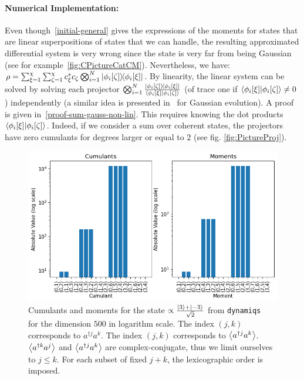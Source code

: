 \paragraph{Numerical Implementation:} Even though~\autoref{initial-general} gives the expressions of the moments for states that are linear superpositions of states that we can handle, the resulting approximated differential system is very wrong since the state is very far from being Gaussian (see for example~\autoref{fig:CPictureCatCM}). Nevertheless, we have: $\rho = \sum_{\xi=1}^\chi \sum_{\zeta=1}^\chi c^*_\xi c_\zeta \bigotimes_{i=1}^N \ketbra{\phi_i[\zeta]}{\phi_i[\xi]}$. By linearity, the linear system can be solved by solving each projector $\bigotimes_{i=1}^N \frac{\ketbra{\phi_i[\zeta]}{\phi_i[\xi]}}{\braket{\phi_i[\xi]}{\phi_i[\zeta]}}$ (of trace one if $\braket{\phi_i[\xi]}{\phi_i[\zeta]} \neq 0$) independently (a similar idea is presented in~\cite{quesada-fast-sum-Gauss} for Gaussian evolution). A proof is given in~\autoref{proof-sum-gauss-non-lin}. This requires knowing the dot products $\braket{\phi_i[\xi]}{\phi_i[\zeta]}$. Indeed, if we consider a sum over coherent states, the projectors have zero cumulants for degrees larger or equal to $2$ (see fig. \ref{fig:PictureProj}).
\begin{center}
    \begin{figure}[h!]
      \centering
      \includegraphics[width=0.8\linewidth]{Pics/PictureCatCM.pdf}
      \caption{Cumulants and moments for the state $\propto \frac{\ket{3} + \ket{-3}}{\sqrt{2}}$ from \texttt{dynamiqs}~\cite{dynamiqs} for the dimension $500$ in logarithm scale. The index $(j, k)$ corresponds to $a^{\dagger j} a^k$. The index $(j, k)$ corresponds to $\left\langle a^{\dagger j} a^k \right\rangle$. $\left\langle a^{\dagger k} a^j \right\rangle$ and $\left\langle a^{\dagger j} a^k \right\rangle$ are complex-conjugate, thus we limit ourselves to $j \le k$. For each subset of fixed $j+k$, the lexicographic order is imposed.}
      \label{fig:CPictureCatCM}
    \end{figure}
\end{center}

